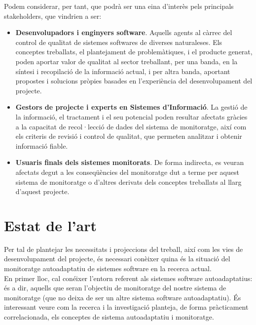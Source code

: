 Podem considerar, per tant, que podrà ser una eina d’interès pels principals stakeholders, que vindrien a ser:
\begin{itemize}
\item \textbf{Desenvolupadors i enginyers software}. Aquells agents al càrrec del control de qualitat de sistemes softwares de diverses naturaleses. Els conceptes treballats, el plantejament de problemàtiques, i el producte generat, poden aportar valor de qualitat al sector treballant, per una banda, en la síntesi i recopilació de la informació actual, i per altra banda, aportant propostes i solucions pròpies basades en l’experiència del desenvolupament del projecte.
\item \textbf{Gestors de projecte i experts en Sistemes d'Informació}. La gestió de la informació, el tractament i el seu potencial poden resultar afectats gràcies a la capacitat de recol·lecció de dades del sistema de monitoratge, així com els criteris de revisió i control de qualitat, que permeten analitzar i obtenir informació fiable.
\item \textbf{Usuaris finals dels sistemes monitorats}. De forma indirecta, es veuran afectats degut a les conseqüències del monitoratge dut a terme per aquest sistema de monitoratge o d’altres derivats dels conceptes treballats al llarg d’aquest projecte.
\end{itemize}


\section{Estat de l'art}

Per tal de plantejar les necessitats i projeccions del treball, així com les vies de desenvolupament del projecte, és necessari conèixer quina és la situació del monitoratge autoadaptatiu de sistemes software en la recerca actual.\\

En primer lloc, cal conéixer l’entorn referent als sistemes software autoadaptatius: és a dir, aquells que seran l’objectiu de monitoratge del nostre sistema de monitoratge (que no deixa de ser un altre sistema software autoadaptatiu). És interessant veure com la recerca i la investigació planteja, de forma pràcticament correlacionada, els conceptes de sistema autoadaptatiu i monitoratge.\\

